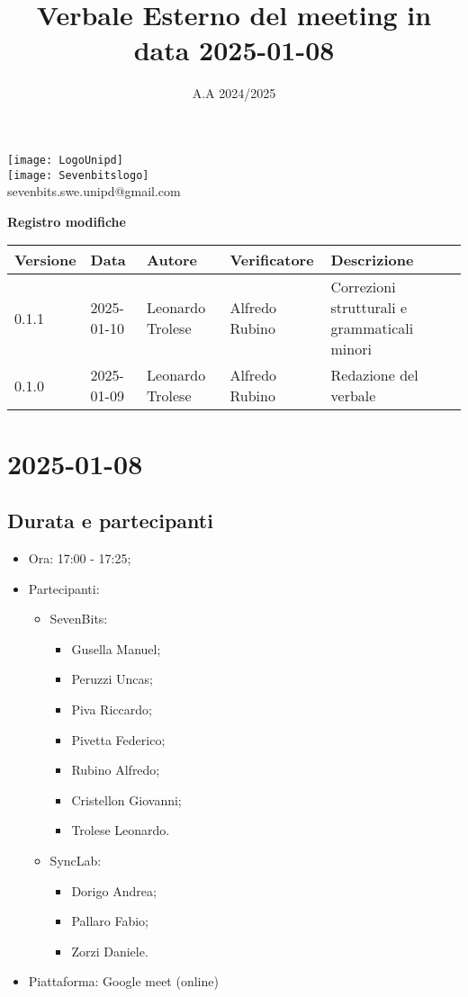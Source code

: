 \documentclass[10pt]{article}
\title{Verbale Esterno del meeting in data 2025-01-08}
\date{A.A 2024/2025}
\begin{document}
\maketitle
\begin{center}
\texttt{[image: LogoUnipd]}\\
\texttt{[image: Sevenbitslogo]}\\
sevenbits.swe.unipd@gmail.com\\
\vspace{2mm}

\textbf{Registro modifiche}\\
\vspace{2mm}
\begin{tabularx}{\textwidth}{|l|l|l|l|X|}
\hline
\textbf{Versione} & \textbf{Data} & \textbf{Autore} & \textbf{Verificatore} & \textbf{Descrizione} \\
\hline
0.1.1 & 2025-01-10 & Leonardo Trolese & Alfredo Rubino & Correzioni strutturali e grammaticali minori \\
\hline
0.1.0 & 2025-01-09 & Leonardo Trolese & Alfredo Rubino & Redazione del verbale \\
\hline
\end{tabularx}
\end{center}

\newpage
\tableofcontents
\newpage
\section{2025-01-08}
\subsection{Durata e partecipanti}
\begin{itemize}
\item Ora: 17:00 - 17:25;
\item Partecipanti: 	
	\begin{itemize}
	\item 	SevenBits:
			\begin{itemize}
				\item Gusella Manuel;
				\item Peruzzi Uncas;
				\item Piva Riccardo;
				\item Pivetta Federico;
				\item Rubino Alfredo;
				\item Cristellon Giovanni;
				\item Trolese Leonardo.
			\end{itemize}
	\item 	SyncLab:
			\begin{itemize}
				\item Dorigo Andrea;
				\item Pallaro Fabio;
				\item Zorzi Daniele.
			\end{itemize}
	\end{itemize}
\item Piattaforma: Google meet (online)
\end{itemize}
\end{document}
